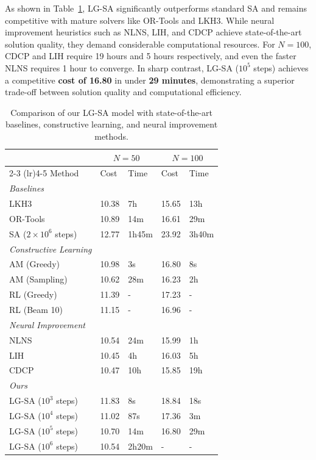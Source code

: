 \documentclass[letterpaper]{article} %
\begin{document}
As shown in Table~\ref{tab:vs_SoA_combined}, LG-SA significantly outperforms standard SA and remains competitive with mature solvers like OR-Tools and LKH3. While neural improvement heuristics such as NLNS, LIH, and CDCP achieve state-of-the-art solution quality, they demand considerable computational resources. For $N=100$, CDCP and LIH require 19 hours and 5 hours respectively, and even the faster NLNS requires 1 hour to converge. In sharp contrast, LG-SA ($10^5$ steps) achieves a competitive \textbf{cost of 16.80} in under \textbf{29 minutes}, demonstrating a superior trade-off between solution quality and computational efficiency.


\begin{table}[t]
\centering
\small
\setlength{\tabcolsep}{3pt}
\begin{tabular}{l llll}
\toprule
& \multicolumn{2}{c}{$N=50$} & \multicolumn{2}{c}{$N=100$} \\
\cmidrule(lr){2-3} \cmidrule(lr){4-5}
Method & Cost & Time & Cost & Time \\
\midrule
\textit{Baselines} & & & & \\
LKH3 & 10.38 & 7h & 15.65 & 13h \\
OR-Tools & 10.89 & 14m & 16.61 & 29m \\
SA ($2 \times 10^6$ steps)  & 12.77 & 1h45m & 23.92 & 3h40m \\
\midrule
\textit{Constructive Learning} & & & & \\
AM (Greedy) & 10.98 & 3s & 16.80 & 8s \\
AM (Sampling) & 10.62 & 28m & 16.23 & 2h \\
RL (Greedy) & 11.39 & - & 17.23 & - \\
RL (Beam 10) & 11.15 & - & 16.96 & - \\
\midrule
\textit{Neural Improvement} & & & & \\
NLNS & 10.54 & 24m & 15.99 & 1h \\
LIH  & 10.45 & 4h & 16.03 & 5h \\
CDCP  & 10.47 & 10h & 15.85 & 19h \\
\midrule
\textit{Ours} & & & & \\
LG-SA ($10^3$ steps) & 11.83 & 8s & 18.84 & 18s \\
LG-SA ($10^4$ steps) & 11.02 & 87s & 17.36 & 3m \\
LG-SA ($10^5$ steps) & 10.70 & 14m & 16.80 & 29m \\
LG-SA ($10^6$ steps) & 10.54 & 2h20m & - & - \\
\bottomrule
\end{tabular}
\caption{Comparison of our LG-SA model with state-of-the-art baselines, constructive learning, and neural improvement methods.}
\label{tab:vs_SoA_combined}
\end{table}
\end{document}
